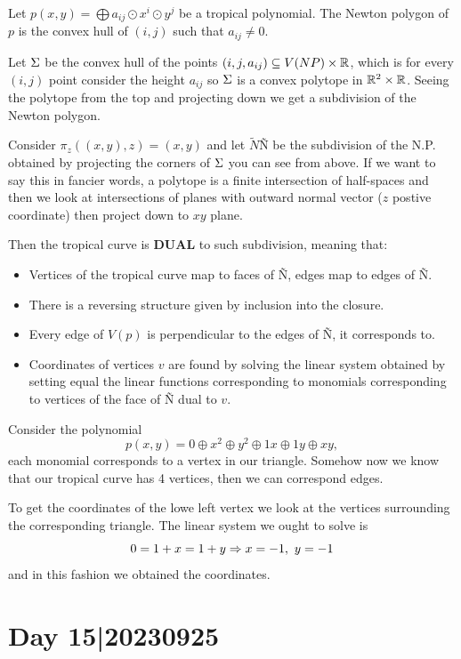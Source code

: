 \documentclass[12pt]{memoir}
\begin{document}
Let $p(x,y)=\bigoplus a_{ij}\odot x^i\odot y^j$ be a tropical polynomial. The Newton polygon of $p$ is the convex hull of $(i,j)$ such that $a_{ij}\neq 0$.\par 
Let $\Sigma$ be the convex hull of the points $(i,j,a_{ij})\subseteq V(NP)\times\mathbb{R}$, which is for every $(i,j)$ point consider the height $a_{ij}$ so $\Sigma$ is a convex polytope in $\mathbb{R}^2\times\mathbb{R}$. Seeing the polytope from the top and projecting down we get a subdivision of the Newton polygon.\par 
Consider $\pi_z((x,y),z)=(x,y)$ and let $\tilde{N}$\~N be the subdivision of the N.P. obtained by projecting the corners of $\Sigma$ you can see from above.
If we want to say this in fancier words, a polytope is a finite intersection of half-spaces and then we look at intersections of planes with outward normal vector ($z$ postive coordinate) then project down to $xy$ plane.\par 
Then the tropical curve is \textbf{DUAL} to such subdivision, meaning that:
\begin{itemize}
    \item Vertices of the tropical curve map to faces of \~N, edges map to edges of \~N.
    \item There is a reversing structure given by inclusion into the closure.
    \item Every edge of $V(p)$ is perpendicular to the edges of \~N, it corresponds to.
    \item Coordinates of vertices $v$ are found by solving the linear system obtained by setting equal the linear functions corresponding to monomials corresponding to vertices of the face of \~N dual to $v$.
\end{itemize}

\begin{Ex}
    Consider the polynomial
    $$p(x,y)=0\oplus x^2\oplus y^2\oplus 1x\oplus 1y\oplus xy,$$
    each monomial corresponds to a vertex in our triangle. Somehow now we know that our tropical curve has 4 vertices, then we can correspond edges.\par 
    To get the coordinates of the lowe left vertex we look at the vertices surrounding the corresponding triangle. The linear system we ought to solve is 
    $$0=1+x=1+y\To x=-1,\ y=-1$$
    and in this fashion we obtained the coordinates. 
\end{Ex}

\section{Day 15|20230925}
\end{document}
